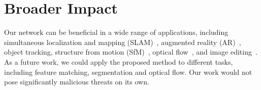 \section*{Broader Impact}
Our network can be beneficial in a wide range of applications, including simultaneous localization and mapping (SLAM)~\cite{bailey2006simultaneous}, augmented reality (AR)~\cite{peebles2021gan}, object tracking, structure from motion (SfM)~\cite{schonberger2016structure}, optical flow~\cite{fleet2006optical}, and image editing~\cite{barnes2009patchmatch,kim2018recurrent}. As a future work, we could apply the proposed method to different tasks, including feature matching, segmentation and optical flow. Our work would not pose significantly malicious threats on its own. 





